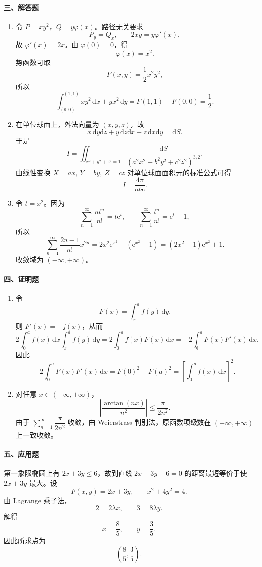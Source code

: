 \paragraph*{三、解答题}
\begin{enumerate}
  \item 令 \(P=xy^2\)，\(Q=y\varphi(x)\)。路径无关要求
  \[
    P_y=Q_x,\qquad 2xy=y\varphi'(x),
  \]
  故 \(\varphi'(x)=2x\)。由 \(\varphi(0)=0\)，得
  \[
    \varphi(x)=x^2.
  \]
  势函数可取
  \[
    F(x,y)=\frac12x^2y^2,
  \]
  所以
  \[
    \int_{(0,0)}^{(1,1)}xy^2\,\mathrm{d}x+yx^2\,\mathrm{d}y
    =F(1,1)-F(0,0)=\frac12.
  \]

  \item 在单位球面上，外法向量为 \((x,y,z)\)，故
  \[
    x\,\mathrm{d}y\mathrm{d}z+y\,\mathrm{d}z\mathrm{d}x+z\,\mathrm{d}x\mathrm{d}y=\mathrm{d}S.
  \]
  于是
  \[
    I=\iint_{x^2+y^2+z^2=1}
    \frac{\mathrm{d}S}{(a^2x^2+b^2y^2+c^2z^2)^{3/2}}.
  \]
  由线性变换 \(X=ax,\ Y=by,\ Z=cz\) 对单位球面面积元的标准公式可得
  \[
    I=\frac{4\pi}{abc}.
  \]

  \item 令 \(t=x^2\)。因为
  \[
    \sum_{n=1}^{\infty}\frac{nt^n}{n!}=t\mathrm{e}^t,\qquad
    \sum_{n=1}^{\infty}\frac{t^n}{n!}=\mathrm{e}^t-1,
  \]
  所以
  \[
    \sum_{n=1}^{\infty}\frac{2n-1}{n!}x^{2n}
    =2x^2\mathrm{e}^{x^2}-(\mathrm{e}^{x^2}-1)
    =(2x^2-1)\mathrm{e}^{x^2}+1.
  \]
  收敛域为 \((-\infty,+\infty)\)。
\end{enumerate}

\paragraph*{四、证明题}
\begin{enumerate}
  \item 令
  \[
    F(x)=\int_x^a f(y)\,\mathrm{d}y.
  \]
  则 \(F'(x)=-f(x)\)，从而
  \[
    2\int_0^a f(x)\,\mathrm{d}x\int_x^a f(y)\,\mathrm{d}y
    =2\int_0^a f(x)F(x)\,\mathrm{d}x
    =-2\int_0^aF(x)F'(x)\,\mathrm{d}x.
  \]
  因此
  \[
    -2\int_0^aF(x)F'(x)\,\mathrm{d}x
    =F(0)^2-F(a)^2
    =\left[\int_0^a f(x)\,\mathrm{d}x\right]^2.
  \]

  \item 对任意 \(x\in(-\infty,+\infty)\)，
  \[
    \left|\frac{\arctan(nx)}{n^2}\right|\le \frac{\pi}{2n^2}.
  \]
  由于 \(\sum_{n=1}^{\infty}\dfrac{\pi}{2n^2}\) 收敛，由 Weierstrass 判别法，原函数项级数在 \((-\infty,+\infty)\) 上一致收敛。
\end{enumerate}

\paragraph*{五、应用题}
第一象限椭圆上有 \(2x+3y\le6\)，故到直线 \(2x+3y-6=0\) 的距离最短等价于使 \(2x+3y\) 最大。设
\[
  F(x,y)=2x+3y,\qquad x^2+4y^2=4.
\]
由 Lagrange 乘子法，
\[
  2=2\lambda x,\qquad 3=8\lambda y.
\]
解得
\[
  x=\frac85,\qquad y=\frac35.
\]
因此所求点为
\[
  \left(\frac85,\frac35\right).
\]
